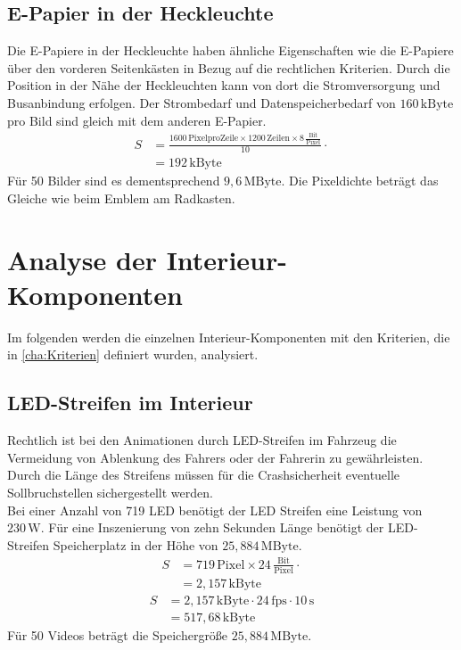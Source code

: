 \subsection{E-Papier in der Heckleuchte}
Die E-Papiere in der Heckleuchte haben ähnliche Eigenschaften wie die E-Papiere über den vorderen Seitenkästen in Bezug auf die rechtlichen Kriterien. Durch die Position in der Nähe der Heckleuchten kann von dort die Stromversorgung und Busanbindung erfolgen. Der Strombedarf und Datenspeicherbedarf von $ 160\,\mathrm{kByte} $ pro Bild sind gleich mit dem anderen E-Papier. 
\begin{align}
	S &= \frac{1600\,\mathrm{Pixel pro Zeile} \times 1200\,\mathrm{Zeilen} \times 8\,\frac{\mathrm{Bit}}{\mathrm{Pixel}}}{10} \cdot \\
	&= 192\,\mathrm{kByte}
\end{align}
Für 50 Bilder sind es dementsprechend $ 9,6\,\mathrm{MByte} $.
Die Pixeldichte beträgt das Gleiche wie beim Emblem am Radkasten.
\section{Analyse der Interieur-Komponenten}
Im folgenden werden die einzelnen Interieur-Komponenten mit den Kriterien, die in \ref{cha:Kriterien} definiert wurden, analysiert.
\subsection{LED-Streifen im Interieur}
Rechtlich ist bei den Animationen durch LED-Streifen im Fahrzeug die Vermeidung von Ablenkung des Fahrers oder der Fahrerin zu gewährleisten.
Durch die Länge des Streifens müssen für die Crashsicherheit eventuelle Sollbruchstellen sichergestellt werden. \\
Bei einer Anzahl von 719 LED benötigt der LED Streifen eine Leistung von $ 230\,\mathrm{W} $.
Für eine Inszenierung von zehn Sekunden Länge benötigt der LED-Streifen Speicherplatz in der Höhe von $ 25,884\,\mathrm{MByte}$.
\begin{align}
	S &= 719\,\mathrm{Pixel} \times 24\,\frac{\mathrm{Bit}}{\mathrm{Pixel}} \cdot \\
	&= 2,157\,\mathrm{kByte}
\end{align}
\begin{align}
	S &= 2,157\,\mathrm{kByte} \cdot 24\,\mathrm{fps} \cdot 10\,\mathrm{s}\\
	&= 517,68\,\mathrm{kByte}
\end{align}
Für 50 Videos beträgt die Speichergröße $ 25,884\,\mathrm{MByte} $.
